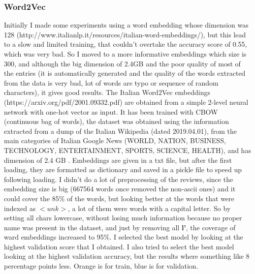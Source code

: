 \documentclass{article}
\begin{document}
            \subsubsection{Word2Vec}
            Initially I made some experiments using a word embedding whose dimension was 128 (http://www.italianlp.it/resources/italian-word-embeddings/), but this lead to a slow and limited training, that couldn't overtake the accuracy score of 0.55, which was very bad.
            So I moved to a more informative embeddings which size is 300, and although the big dimension of 2.4GB and the poor quality of most of the entries (it is automatically generated and the quality of the words extracted from the data is very bad, lot of words are typo or sequence of random characters), it gives good results.
            The Italian Word2Vec embeddings (https://arxiv.org/pdf/2001.09332.pdf) are obtained from a simple 2-level neural network with one-hot vector as input.
            It has been trained with CBOW (continuous bag of words), the dataset was obtained using the information extracted from a dump of the Italian Wikipedia (dated 2019.04.01), from the main
categories of Italian Google News (WORLD, NATION, BUSINESS, TECHNOLOGY, ENTERTAINMENT, SPORTS, SCIENCE, HEALTH), and has dimension of 2.4 GB .
            Embeddings are given in a txt file, but after the first loading, they are formatted as dictionary and saved in a pickle file
            to speed up following loading.
            I didn't do a lot of preprocessing of the reviews, since the embedding size is big (667564 words once removed the non-ascii ones) and it could cover the 85\% of the words, but looking better at the words that were indexed as $<unk>$, a lot of them were words with a capital letter.
            So by setting all chars lowercase, without losing much information because no proper name was present in the dataset, and just by removing all \textbf{l'}, the coverage of ward embeddings increased to 95\%.
            I selected the best model by looking at the highest validation score that I obtained.
            I also tried to select the best model looking at the highest validation accuracy, but the results where something like 8 percentage points less.
            \color{orange} Orange is for train, \color{blue} blue is for validation.\color{black}
\end{document}
